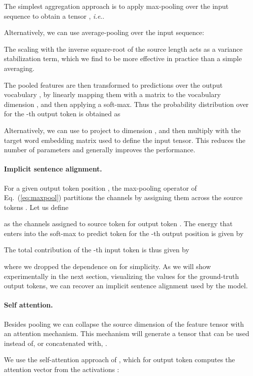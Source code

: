 \documentclass[11pt,a4paper]{article}
\makeatletter
\DeclareRobustCommand\onedot{\futurelet\@let@token\@onedot}
\def\@onedot{\ifx\@let@token.\else.\null\fi\xspace}
\def\ie{\emph{i.e}\onedot} \def\Ie{\emph{I.e}\onedot}
\def\Eq#1{Eq.~(\ref{eq:#1})}
\makeatother
\begin{document}
The simplest aggregation approach is to apply max-pooling over the input sequence to obtain a tensor , \ie 

Alternatively, we can use average-pooling over the input sequence:

The scaling with the inverse square-root of the source length acts as a variance stabilization term, which we find to be more effective in practice than a simple averaging.

The pooled features are then transformed to predictions over the output vocabulary , 
by linearly mapping them with a matrix  to the vocabulary dimension , and then applying a soft-max. 
Thus the probability distribution over  for the -th output token is obtained as 

Alternatively, we can use  to project to dimension , and then multiply with the target word embedding matrix used to define the input tensor. 
This reduces the number of parameters and generally improves the performance.





\paragraph{Implicit sentence alignment.} \label{para:align}
For a given output token position , the max-pooling operator of \Eq{maxpool} partitions the  channels 
by assigning them across the source tokens .  
Let us define 

as the channels assigned to source token  for output token .
The energy that enters into the soft-max to predict token  for the -th output position is given by 

The total contribution of the -th input token is thus given by 

where we dropped the dependence on  for simplicity. 
As we will show experimentally in the next section, visualizing the values  for the ground-truth output tokens, we can recover an implicit sentence alignment used by the model.


\paragraph{Self attention.}
Besides  pooling we can collapse the source dimension of the feature tensor with an attention mechanism. 
This mechanism will generate a tensor  that can be used instead of, or concatenated with, .

We use the self-attention approach of \citet{lin17iclr}, 
which for output token  computes the attention vector  from the  activations :
\end{document}
